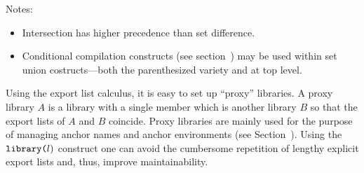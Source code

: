 \noindent Notes:
\begin{itemize}\setlength{\itemsep}{0pt}
\item Intersection has higher precedence than set difference.
\item Conditional compilation constructs (see
section~) may be used within set union
costructs---both the parenthesized variety and at top level.
\end{itemize}

Using the export list calculus, it is easy to set up ``proxy''
libraries.  A proxy library $A$ is a library with a single member
which is another library $B$ so that the export lists of $A$ and $B$
coincide.  Proxy libraries are mainly used for the purpose of managing
anchor names and anchor environments (see
Section~).  Using the $\mbox{\tt
library(}l\mbox{)}$ construct one can avoid the cumbersome repetition
of lengthy explicit export lists and, thus, improve maintainability.
